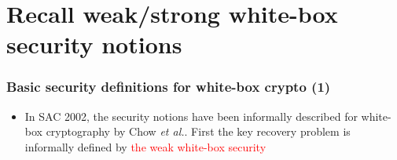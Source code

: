 \documentclass{beamer}
\begin{document}
\section{Recall weak/strong white-box security notions}
\frame
{
\frametitle{Basic security definitions for white-box crypto (1)}
\begin{itemize}
\item In SAC 2002, the security notions have  been informally described for white-box cryptography by Chow \textit{et al.}. First the key recovery problem is informally defined by \textcolor{red}{the weak white-box security}
\end{itemize}


\begin{center}
\end{center}
}
\end{document}
